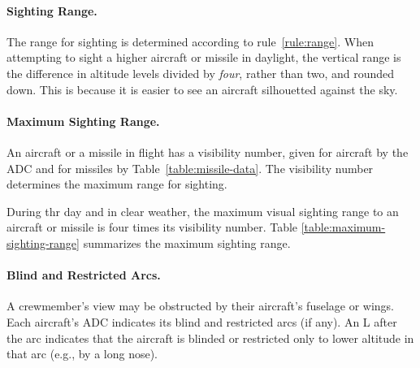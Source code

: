 {

}{

\paragraph{Sighting Range.} The range for sighting is determined according to rule~\ref{rule:range}. When attempting to sight a higher aircraft or missile in daylight, the vertical range is the difference in altitude levels divided by \emph{four}, rather than two, and rounded down. This is because it is easier to see an aircraft silhouetted against the sky.


\paragraph{Maximum Sighting Range.} An aircraft or a missile in flight has a visibility number, given for aircraft by the ADC and for missiles by Table~\ref{table:missile-data}. The visibility number determines the maximum range for sighting.

During thr day and in clear weather, the maximum visual sighting range to an aircraft or missile is four times its visibility number. Table \ref{table:maximum-sighting-range} summarizes the maximum sighting range.


\paragraph{Blind and Restricted Arcs.} A crewmember’s view may be obstructed by their aircraft’s fuselage or wings. Each aircraft’s ADC indicates its blind and restricted  arcs (if any). An L after the arc indicates that the aircraft is blinded or restricted only to lower altitude in that arc (e.g., by a long nose). 

}
